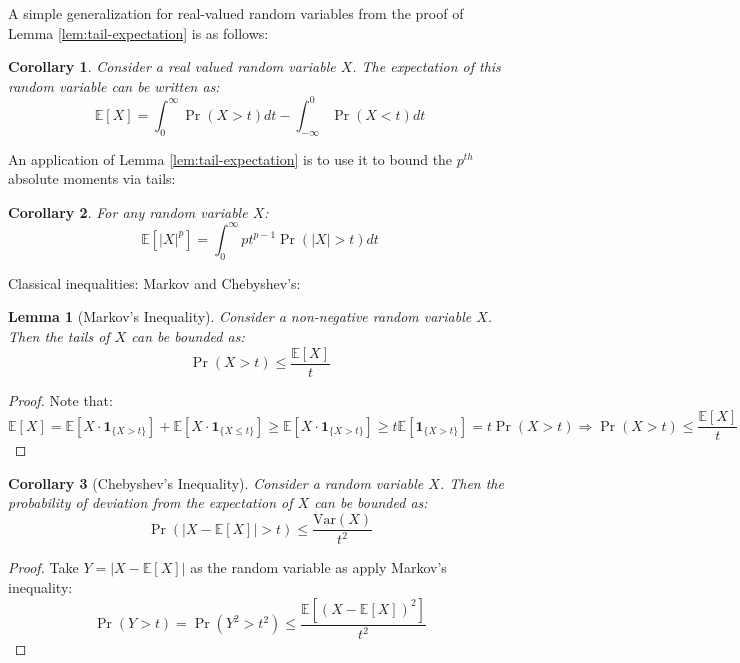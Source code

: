 \documentclass{article}
\newtheorem{corollary}{Corollary}[subsection]
\newtheorem{lemma}{Lemma}[subsection]
\theoremstyle{remark}
\newcommand{\Exp}{\mathbb{E}}
\newcommand{\Var}{\mathrm{Var}}
\newcommand{\indic}[1]{\mathbf{1}_{\{#1\}}}
\begin{document}
A simple generalization for real-valued random variables from the proof of Lemma \ref{lem:tail-expectation} is as follows:
\begin{corollary}
Consider a real valued random variable \(X\). The expectation of this random variable can be written as:
\begin{equation*}
\Exp[X] = \int_{0}^{\infty} \Pr(X > t) dt - \int_{-\infty}^{0} \Pr(X < t) dt
\end{equation*}
\end{corollary}

An application of Lemma \ref{lem:tail-expectation} is to use it to bound the \(p^{th}\) absolute moments via tails:
\begin{corollary}
For any random variable \(X\):
\begin{equation*}
\Exp\left[|X|^{p}\right] = \int_{0}^{\infty} pt^{p-1} \Pr(|X| > t) dt
\end{equation*}
\end{corollary}

Classical inequalities: Markov and Chebyshev's:
\begin{lemma}[Markov's Inequality]
Consider a non-negative random variable \(X\). Then the tails of \(X\) can be bounded as:
\begin{equation*}
\Pr(X > t) \leq \frac{\Exp[X]}{t}
\end{equation*}
\end{lemma}

\begin{proof}
Note that:
\begin{equation*}
\Exp[X] = \Exp[X \cdot \indic{X > t}] + \Exp[X \cdot \indic{X \leq t}] \geq \Exp[X \cdot \indic{X > t}] \geq t \Exp[\indic{X > t}] = t \Pr(X > t) \Rightarrow \Pr(X > t) \leq \frac{\Exp[X]}{t}
\end{equation*}
\end{proof}

\begin{corollary}[Chebyshev's Inequality]
Consider a random variable \(X\). Then the probability of deviation from the expectation of \(X\) can be bounded as:
\begin{equation*}
\Pr(|X - \Exp[X]| > t) \leq \frac{\Var(X)}{t^{2}}
\end{equation*}
\end{corollary}

\begin{proof}
Take \(Y = |X - \Exp[X]|\) as the random variable as apply Markov's inequality:
\begin{equation*}
\Pr(Y > t) = \Pr(Y^{2} > t^{2}) \leq \frac{\Exp[(X - \Exp[X])^{2}]}{t^{2}}
\end{equation*}
\end{proof}
\end{document}
